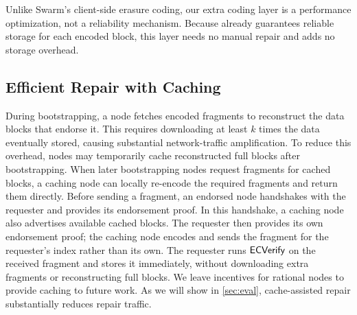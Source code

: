 Unlike Swarm's client-side erasure coding, our extra coding layer is a performance optimization, not a reliability mechanism.
Because \sys already guarantees reliable storage for each encoded block, this layer needs no manual repair and adds no storage overhead.

\subsection{Efficient Repair with Caching}
\label{sec:impl:repair}

During bootstrapping, a node fetches encoded fragments to reconstruct the data blocks that endorse it.
This requires downloading at least $k$ times the data eventually stored, causing substantial network-traffic amplification.
To reduce this overhead, nodes may temporarily cache reconstructed full blocks after bootstrapping.
When later bootstrapping nodes request fragments for cached blocks, a caching node can locally re-encode the required fragments and return them directly.
 
Before sending a fragment, an endorsed node handshakes with the requester and provides its endorsement proof.
In this handshake, a caching node also advertises available cached blocks.
The requester then provides its own endorsement proof; the caching node encodes and sends the fragment for the requester's index rather than its own.
The requester runs $\textsf{ECVerify}$ on the received fragment and stores it immediately, without downloading extra fragments or reconstructing full blocks.
We leave incentives for rational nodes to provide caching to future work.
As we will show in \cref{sec:eval}, cache-assisted repair substantially reduces repair traffic.